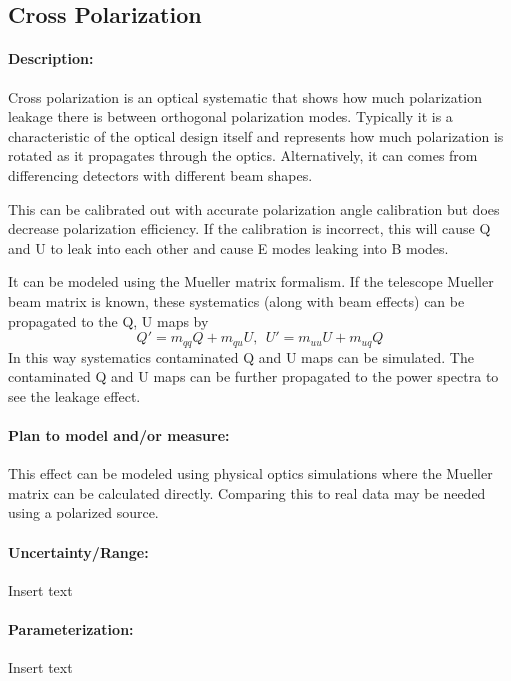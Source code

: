 
\subsection{Cross Polarization}

\paragraph{Description:}
Cross polarization is an optical systematic that shows how much polarization leakage there is between orthogonal polarization modes. Typically it is a characteristic of the optical design itself and represents how much polarization is rotated as it propagates through the optics. Alternatively, it can comes from differencing detectors with different beam shapes.

This can be calibrated out with accurate polarization angle calibration but does decrease polarization efficiency. If the calibration is incorrect, this will cause Q and U to leak into each other and cause E modes leaking into B modes. 

It can be modeled using the Mueller matrix formalism. If the telescope Mueller beam matrix is known, these systematics (along with beam effects) can be propagated to the Q, U maps by
\begin{equation}
Q' = m_{qq} Q + m_{qu} U, \ \ U' = m_{uu} U + m_{uq} Q
\end{equation}
In this way systematics contaminated Q and U maps can be simulated. The contaminated Q and U maps can be further propagated to the power spectra to see the leakage effect.

\paragraph{Plan to model and/or measure:}
This effect can be modeled using physical optics simulations where the Mueller matrix can be calculated directly. Comparing this to real data may be needed using a polarized source.

\paragraph{Uncertainty/Range:}
Insert text

\paragraph{Parameterization:}
Insert text

